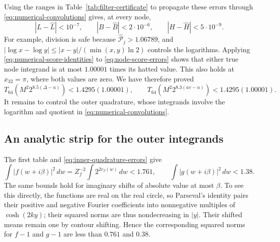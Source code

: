 Using the ranges in Table~\ref{tab:filter-certificate} to propagate
these errors through \eqref{eq:numerical-convolutions} gives, at every
node,
\begin{equation}\label{eq:node-score-errors}
 |L-\widehat L|<10^{-7},\qquad
 |B-\widehat B|<2\cdot10^{-6},\qquad
 |H-\widehat H|<5\cdot10^{-9}.
\end{equation}
For example, division is safe because
$\widehat{\mathcal P}_j>1.06789$, and
$|\log x-\log y|\le |x-y|/(\min(x,y)\ln2)$ controls the logarithms.
Applying \eqref{eq:numerical-score-identities} to
\eqref{eq:node-score-errors} shows that either true node integrand
is at most $1.00001$ times its hatted value.  This also holds at
$x_{32}=\pi$, where both values are zero.  We have therefore proved
\begin{equation}\label{eq:outer-node-bound}
 T_{64}(M^2 2^{8.5(\Delta-u)})<1.4295(1.00001),\qquad
 T_{64}(M^2 2^{8.3(av-u)})<1.4295(1.00001).
\end{equation}
It remains to control the outer quadrature, whose integrands involve
the logarithm and quotient in \eqref{eq:numerical-convolutions}.

\subsection{An analytic strip for the outer integrands}

The first table and \eqref{eq:inner-quadrature-errors} give
\begin{equation}\label{eq:shifted-l2}
 \int|f(w+i\beta)|^2\,dw
     =Z_f^{-2}\int2^{2r_\beta(w)}\,dw<1.761,
 \qquad
 \int|g(w+i\beta)|^2\,dw<1.38.
\end{equation}
The same bounds hold for imaginary shifts of absolute value at most
$\beta$.  To see this directly, the functions are real on the real
circle, so Parseval's identity pairs their positive and negative
Fourier coefficients into nonnegative multiples of
$\cosh(2k y)$; their squared norms are thus nondecreasing in $|y|$.
Their shifted means remain one by contour shifting.  Hence the
corresponding squared norms for $f-1$ and $g-1$ are less than $0.761$
and $0.38$.

